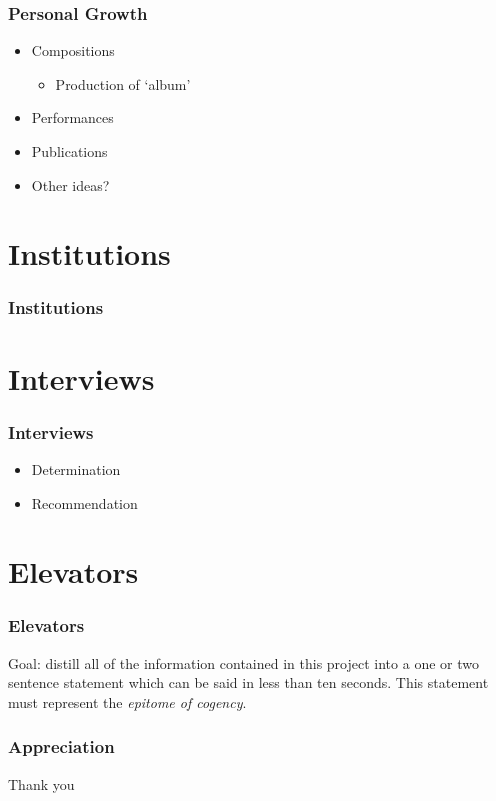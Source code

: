 \documentclass[xetex,mathserif,14pt]{beamer}
\begin{document}
\begin{frame}
  \frametitle{Personal Growth}
  \begin{itemize}
  \item<1-> Compositions
    \begin{itemize}
    \item<1-> Production of `album'
    \end{itemize}
  \item<2-> Performances
  \item<3-> Publications
  \item<4-> Other ideas?
  \end{itemize}
\end{frame}
\section{Institutions}
\begin{frame}[shrink]
  \frametitle{Institutions}
  \begin{table}
  \end{table}

\end{frame}

\section{Interviews}
\begin{frame}
  \frametitle{Interviews}
  \begin{itemize}
  \item<1-> Determination
  \item<2-> Recommendation
  \end{itemize}
\end{frame}

\section{Elevators}
\begin{frame}
  \frametitle{Elevators}
  Goal: distill all of the information contained in this project into a one or
  two sentence statement which can be said in less than ten seconds. This
  statement must represent the \emph{epitome of cogency}.
\end{frame}

\begin{frame}
  \frametitle{Appreciation}
  Thank you
\end{frame}
\end{document}
